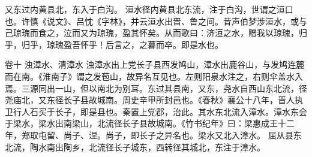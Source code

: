 \documentclass[12pt,UTF8]{ctexbook}
\begin{document}
又东过内黄县北，东入于白沟。
洹水径内黄县北东流，注于白沟，世谓之洹口也。许慎《说文》、吕忱《字林》，并云洹水出晋、鲁之间。昔声伯梦涉洹水，或与己琼瑰而食之，泣而又为琼瑰，盈其怀矣。从而歌曰：济洹之水，赠我以琼瑰，归乎，归乎，琼瑰盈吾怀乎！后言之，之暮而卒。即是水也。 


卷十 浊漳水、清漳水 
浊漳水出上党长子县西发鸠山，漳水出鹿谷山，与发鸠连麓而在南。《淮南子》谓之发苞山，故异名互见也。左则阳泉水注之，右则伞盖水入焉。三源同出一山，但以南北为别耳。东过其县南，又东，尧水自西山东北流，径尧庙北，又东径长子县故城南。周史辛甲所封邑也。《春秋》襄公十八年，晋人执卫行人石买于长子，即是县也。秦置上党郡，治此。其水东北流入漳水。漳水东会于梁水，梁水出南梁山，北流径长子县故城南。《竹书纪年》曰：梁惠成王十二年，郑取屯留、尚子、涅。尚子，即长子之异名也。梁水又北入漳水。
屈从县东北流，陶水南出陶乡，北流径长子城东，西转径其城北，东注于漳水。
\end{document}
